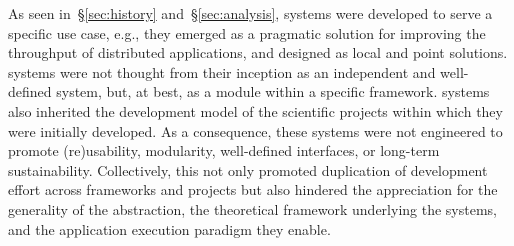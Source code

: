 \documentclass{sig-alternate}
\begin{document}
As seen in~\S\ref{sec:history} and~\S\ref{sec:analysis}, \pilot systems were
developed to serve a specific use case, e.g., they emerged as a pragmatic
solution for improving the throughput of distributed applications, and designed
as local and point solutions. \pilot systems were not thought from their
inception as an independent and well-defined system, but, at best, as a module
within a specific framework. \pilot systems also inherited the development model
of the scientific projects within which they were initially developed. As a
consequence, these systems were not engineered to promote (re)usability,
modularity, well-defined interfaces, or long-term sustainability. Collectively,
this not only promoted duplication of development effort across frameworks and
projects but also hindered the appreciation for the generality of the \pilot
abstraction, the theoretical framework underlying the \pilot systems, and the
application execution paradigm they enable.




\end{document}
